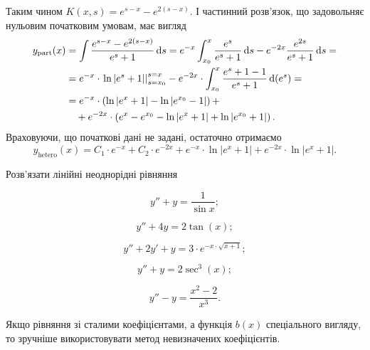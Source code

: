 \begin{solution}
	Таким чином $K(x, s) = e^{s - x} - e^{2(s - x)}$. І частинний роз\-в'яз\-ок, що задовольняє нульовим початковим умовам, має вигляд
	\begin{align*}
		y_{\text{part}}(x) &= \int \frac{e^{s - x} - e^{2(s - x)}}{e^s + 1} \mathop{}\!\mathrm{d} s = e^{-x} \int_{x_0}^x \frac{e^s}{e^s + 1} \mathop{}\!\mathrm{d} s - e^{-2x} \frac{e^{2 s}}{e^s + 1} \mathop{}\!\mathrm{d} s = \\ &= e^{-x} \cdot \left. \ln |e^s + 1| \right|_{s = x_0}^{s = x} - e^{-2x} \cdot \int_{x_0}^x \frac{e^s + 1 - 1}{e^s + 1} \mathop{}\!\mathrm{d} (e^s) = \\ &= e^{-x} \cdot \left( \ln |e^x + 1| - \ln |e^{x_0} - 1| \right) + \\ & \quad + e^{-2x} \cdot \left( e^x - e^{x_0} - \ln |e^x + 1| + \ln |e^{x_0} + 1| \right).
	\end{align*}
	Враховуючи, що початкові дані не задані, остаточно отримаємо
	\begin{equation*}
		y_{\text{hetero}}(x) = C_1 \cdot e^{-x} + C_2 \cdot e^{-2x} + e^{-x} \cdot \ln |e^x + 1| + e^{-2x} \cdot \ln |e^x + 1|.
	\end{equation*}
\end{solution}

Розв’язати лінійні неоднорідні рівняння
\begin{multicols}{2}
\begin{problem}
	\[y'' + y = \frac{1}{\sin x};\]
\end{problem}
\begin{problem}
	\[y'' + 4 y = 2 \tan (x);\]
\end{problem}
\begin{problem}
	\[y'' + 2 y' + y = 3 \cdot e^{-x \cdot \sqrt{x + 1}};\]
\end{problem}
\begin{problem}
	\[y'' + y = 2 \sec^3(x);\]
\end{problem}
\begin{problem}
	\[y'' - y= \frac{x^2 - 2}{x^3}.\]
\end{problem}
\end{multicols}

Якщо рівняння зі сталими коефіцієнтами, а функція $b(x)$ спеціального вигляду, то зручніше використовувати метод невизначених коефіцієнтів.

